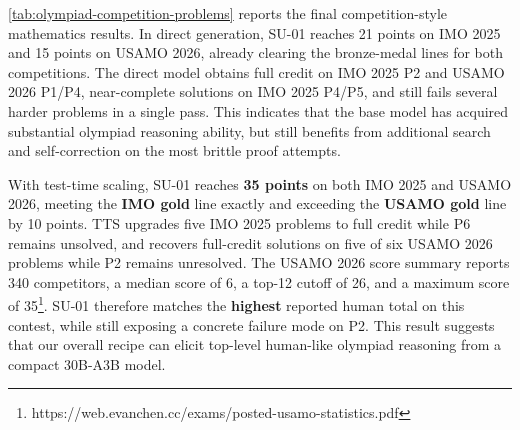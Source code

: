 \documentclass{llmxive}
\begin{document}
\cref{tab:olympiad-competition-problems} reports the final competition-style
mathematics results. In direct generation, SU-01 reaches 21 points on IMO 2025
and 15 points on USAMO 2026, already clearing the bronze-medal lines for both
competitions. 
The direct
model obtains full credit on IMO 2025 P2 and USAMO 2026 P1/P4, near-complete
solutions on IMO 2025 P4/P5, and still fails several harder problems in a
single pass. 
This indicates that the base model has acquired substantial
olympiad reasoning ability, but still benefits from additional search and
self-correction on the most brittle proof attempts.

With test-time scaling, SU-01 reaches \textbf{35 points} on both IMO 2025 and USAMO 2026, meeting the \textbf{IMO gold} line exactly and exceeding the \textbf{USAMO gold} line by 10
points. TTS upgrades five IMO 2025 problems to full credit while P6 remains unsolved, and recovers full-credit solutions on five of six USAMO 2026 problems while
P2 remains unresolved. The USAMO 2026 score summary reports 340 competitors, a median score of 6, a top-12 cutoff of 26, and a maximum score of 35\footnote{https://web.evanchen.cc/exams/posted-usamo-statistics.pdf}. 
SU-01
therefore matches the \textbf{highest} reported human total on this contest, while still exposing a concrete failure mode on P2. 
This result suggests that our overall
recipe can elicit top-level human-like olympiad reasoning from a compact 30B-A3B model.
\end{document}
